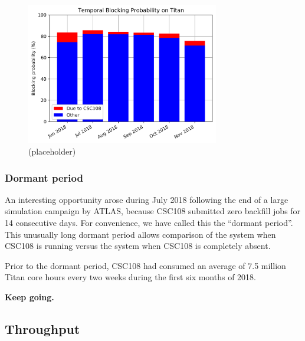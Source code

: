 \begin{figure}
  \includegraphics[width=0.75\textwidth]{images/barplot-temporal-blocking-by-month.png}
\caption{(placeholder)}
\label{fig:temporal-blocking-by-month}
\end{figure}



\subsubsection{Dormant period}
\label{subsubsec:dormantperiod}

An interesting opportunity arose during July 2018 following the end of a large
simulation campaign by ATLAS, because CSC108 submitted zero backfill jobs for
14 consecutive days. For convenience, we have called this the ``dormant
period''. This unusually long dormant period allows comparison of the system
when CSC108 is running versus the system when CSC108 is completely absent.

Prior to the dormant period, CSC108 had consumed an average of 7.5 million
Titan core hours every two weeks during the first six months of 2018.



\textbf{Keep going.}


\subsection{Throughput}
\label{subsec:throughput}


